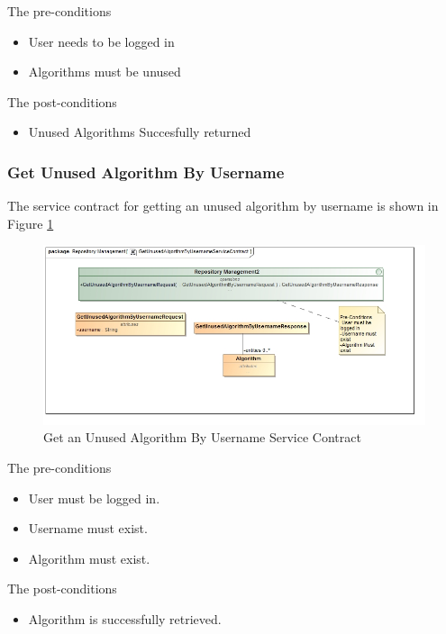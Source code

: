 The pre-conditions
\begin{itemize}
  \item User needs to be logged in
  \item Algorithms must be unused
\end{itemize}

The post-conditions
\begin{itemize}
  \item Unused Algorithms Succesfully returned
\end{itemize}

\subsubsection{Get Unused Algorithm By Username}
The service contract for getting an unused algorithm by username is shown in Figure \ref{fig:getUnusedAlgorithmByUsername}
\begin{figure}[H]
	\begin{center}
		\includegraphics[scale=0.6]{../Diagrams and Charts/Test Data/GetUnusedAlgorithmByUsernameServiceContract.jpg}
		\caption{Get an Unused Algorithm By Username Service Contract}
		\label{fig:getUnusedAlgorithmByUsername}
	\end{center}
	
\end{figure}	

The pre-conditions
\begin{itemize}
	\item User must be logged in.
	\item Username must exist.
	\item Algorithm must exist.
\end{itemize}

The post-conditions
\begin{itemize}
	\item Algorithm is successfully retrieved.
\end{itemize}

